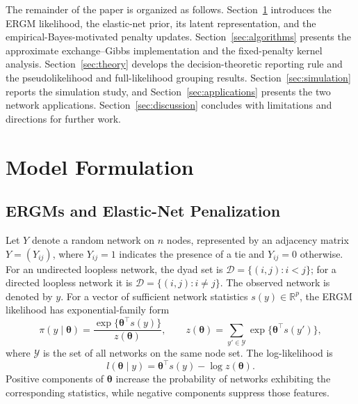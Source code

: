 \documentclass[preprint,12pt,authoryear]{elsarticle}
\def\th{\boldsymbol{\theta}}
\begin{document}
The remainder of the paper is organized as follows.
Section~\ref{sec:model} introduces the ERGM likelihood, the elastic-net prior,
its latent representation, and the empirical-Bayes-motivated penalty updates.
Section~\ref{sec:algorithms} presents the approximate exchange--Gibbs
implementation and the fixed-penalty kernel analysis.
Section~\ref{sec:theory} develops the decision-theoretic reporting rule and the
pseudolikelihood and full-likelihood grouping results.
Section~\ref{sec:simulation} reports the
simulation study, and Section~\ref{sec:applications} presents the two network
applications. Section~\ref{sec:discussion} concludes with limitations and
directions for further work.



\section{Model Formulation}\label{sec:model}
\subsection{ERGMs and Elastic-Net Penalization}
Let \(Y\) denote a random network on \(n\) nodes, represented by an adjacency matrix \(Y=(Y_{ij})\), where \(Y_{ij}=1\) indicates the presence of a tie and \(Y_{ij}=0\) otherwise. For an undirected loopless network, the dyad set is \(\mathcal D=\{(i,j):i<j\}\); for a directed loopless network it is \(\mathcal D=\{(i,j):i\ne j\}\). The observed network is denoted by \(y\). For a vector of sufficient network statistics \(s(y)\in\mathbb R^p\), the ERGM likelihood has exponential-family form \citep{lusher2013}
\begin{equation}
 \pi (y \mid \th) = \frac{\exp\{\th^\top s(y)\}}{z(\th)},
 \qquad
 z(\th)=\sum_{y'\in\mathcal Y}\exp\{\th^\top s(y')\},
\end{equation}
where \(\mathcal Y\) is the set of all networks on the same node set. The log-likelihood is
\begin{equation}
  l(\th\mid y)=\th^\top s(y)-\log z(\th).
\end{equation}
Positive components of \(\th\) increase the probability of networks exhibiting the corresponding statistics, while negative components suppress those features.
\end{document}
